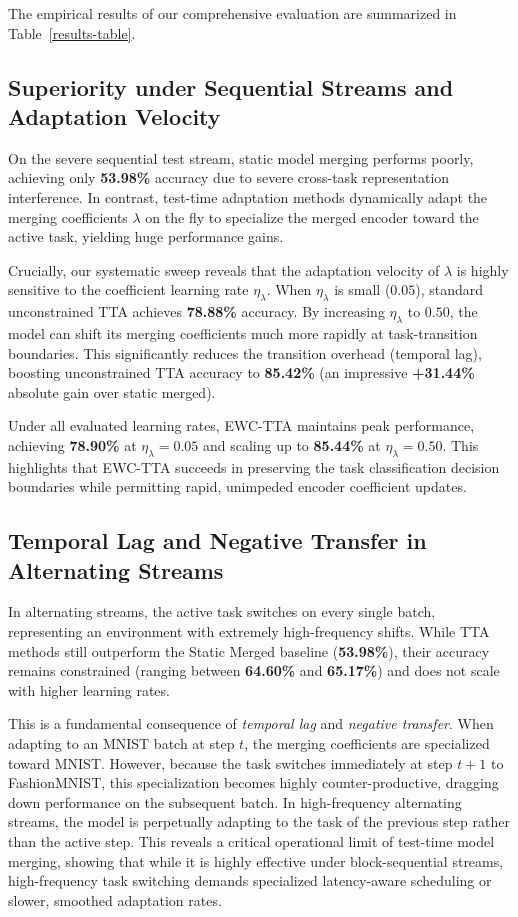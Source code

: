 \documentclass{article}
\theoremstyle{plain}
\theoremstyle{definition}
\theoremstyle{remark}
\begin{document}
The empirical results of our comprehensive evaluation are summarized in Table~\ref{results-table}. 

\subsection{Superiority under Sequential Streams and Adaptation Velocity}
On the severe sequential test stream, static model merging performs poorly, achieving only \textbf{53.98\%} accuracy due to severe cross-task representation interference. In contrast, test-time adaptation methods dynamically adapt the merging coefficients $\lambda$ on the fly to specialize the merged encoder toward the active task, yielding huge performance gains.

Crucially, our systematic sweep reveals that the adaptation velocity of $\lambda$ is highly sensitive to the coefficient learning rate $\eta_\lambda$. When $\eta_\lambda$ is small ($0.05$), standard unconstrained TTA achieves \textbf{78.88\%} accuracy. By increasing $\eta_\lambda$ to $0.50$, the model can shift its merging coefficients much more rapidly at task-transition boundaries. This significantly reduces the transition overhead (temporal lag), boosting unconstrained TTA accuracy to \textbf{85.42\%} (an impressive \textbf{+31.44\%} absolute gain over static merged). 

Under all evaluated learning rates, EWC-TTA maintains peak performance, achieving \textbf{78.90\%} at $\eta_\lambda = 0.05$ and scaling up to \textbf{85.44\%} at $\eta_\lambda = 0.50$. This highlights that EWC-TTA succeeds in preserving the task classification decision boundaries while permitting rapid, unimpeded encoder coefficient updates.

\subsection{Temporal Lag and Negative Transfer in Alternating Streams}
In alternating streams, the active task switches on every single batch, representing an environment with extremely high-frequency shifts. While TTA methods still outperform the Static Merged baseline (\textbf{53.98\%}), their accuracy remains constrained (ranging between \textbf{64.60\%} and \textbf{65.17\%}) and does not scale with higher learning rates.

This is a fundamental consequence of \textit{temporal lag} and \textit{negative transfer}. When adapting to an MNIST batch at step $t$, the merging coefficients are specialized toward MNIST. However, because the task switches immediately at step $t+1$ to FashionMNIST, this specialization becomes highly counter-productive, dragging down performance on the subsequent batch. In high-frequency alternating streams, the model is perpetually adapting to the task of the previous step rather than the active step. This reveals a critical operational limit of test-time model merging, showing that while it is highly effective under block-sequential streams, high-frequency task switching demands specialized latency-aware scheduling or slower, smoothed adaptation rates.
\end{document}

